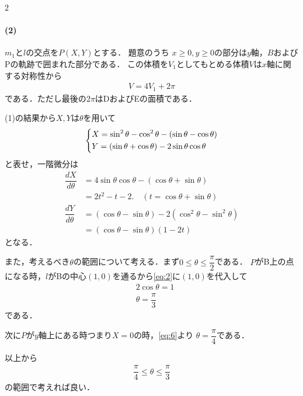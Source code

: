 \documentclass[../../main.tex]{subfiles}
\begin{document}
\begin{multicols}{2}
  \paragraph{(2)}
  $m_1$と$l$の交点を$P(X,Y)$とする．
  題意のうち $x \ge 0,  y \ge 0$の部分は$y$軸，$B$およびPの軌跡で囲まれた部分である．
  この体積を$V_1$としてもとめる体積$V$は$x$軸に関する対称性から
  \begin{align}
    V = 4V_1 + 2\pi\label{eq:5}
  \end{align}
  である．ただし最後の$2\pi$はDおよびEの面積である．

  (1)の結果から$X,Y$は$\theta$を用いて
  \begin{align}
    \begin{dcases}
      X = \sin^2\theta - \cos^2\theta - (\sin\theta-\cos\theta) \\
      Y = (\sin\theta+\cos\theta) - 2\sin\theta\cos\theta
    \end{dcases} \label{eq:6}
  \end{align}
  と表せ，一階微分は
  \begin{align}
    \dfrac{dX}{d\theta}
    & = 4\sin\theta\cos\theta - (\cos\theta+\sin\theta)                     \\
    & = 2t^2 - t - 2. \quad (t=\cos\theta+\sin\theta)   \label{eq:7} \\
    \dfrac{dY}{d\theta}
    & = (\cos\theta-\sin\theta) - 2(\cos^2\theta-\sin^2\theta)              \\
    & = (\cos\theta-\sin\theta)(1-2t) \label{eq:8}
  \end{align}
  となる．

  また，考えるべき$\theta$の範囲について考える．まず$0 \le \theta \le \dfrac{\pi}{2}$である．
  $P$がB上の点になる時，$l$がBの中心$(1,0)$を通るから\cref{eq:2}に$(1,0)$を代入して
  \begin{align}
    & 2 \cos\theta = 1       \\
    & \theta = \dfrac{\pi}{3}
  \end{align}
  である．

  次に$P$が$y$軸上にある時つまり$X=0$の時，\cref{eq:6}より
  $\theta=\dfrac{\pi}{4}$である．

  以上から
  \begin{align}
    \dfrac{\pi}{4} \le \theta \le \dfrac{\pi}{3}
  \end{align}
  の範囲で考えれば良い．

  \begin{figure}[H]
    \centering
\end{figure}
\end{multicols}
\end{document}
